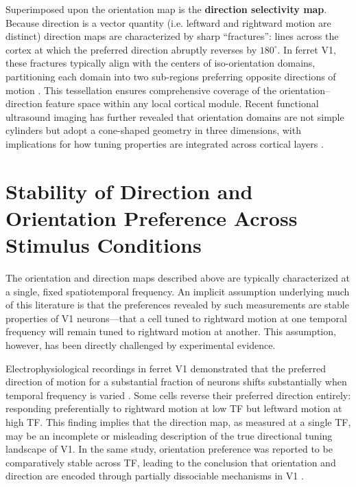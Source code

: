 \documentclass{brandeis-thesis3.3}
\begin{document}
Superimposed upon the orientation map is the \textbf{direction
selectivity map}. Because direction is a vector quantity (i.e. leftward and
rightward motion are distinct) direction maps are characterized by
sharp ``fractures'': lines across the cortex at which the preferred
direction abruptly reverses by $180^{\circ}$. In ferret V1, these
fractures typically align with the centers of iso-orientation domains,
partitioning each domain into two sub-regions preferring opposite
directions of motion \citep{Weliky1996, Clemens2012}. This tessellation
ensures comprehensive coverage of the orientation--direction feature
space within any local cortical module. Recent functional ultrasound
imaging has further revealed that orientation domains are not simple
cylinders but adopt a cone-shaped geometry in three dimensions, with
implications for how tuning properties are integrated across cortical
layers \citep{Hu2023}.

\section{Stability of Direction and Orientation Preference
  Across Stimulus Conditions}

The orientation and direction maps described above are typically
characterized at a single, fixed spatiotemporal frequency. An implicit
assumption underlying much of this literature is that the preferences
revealed by such measurements are stable properties of V1 neurons---that
a cell tuned to rightward motion at one temporal frequency will remain
tuned to rightward motion at another. This assumption, however, has
been directly challenged by experimental evidence.

Electrophysiological recordings in ferret V1 demonstrated that the
preferred direction of motion for a substantial fraction of neurons
shifts substantially when temporal frequency is varied
\citep{Moore2005}. Some cells reverse their preferred direction
entirely: responding preferentially to rightward motion at low TF but
leftward motion at high TF. This finding implies that the direction map,
as measured at a single TF, may be an incomplete or misleading
description of the true directional tuning landscape of V1. In the same
study, orientation preference was reported to be comparatively stable
across TF, leading to the conclusion that orientation and direction are
encoded through partially dissociable mechanisms in V1 \citep{Moore2005}.
\end{document}

